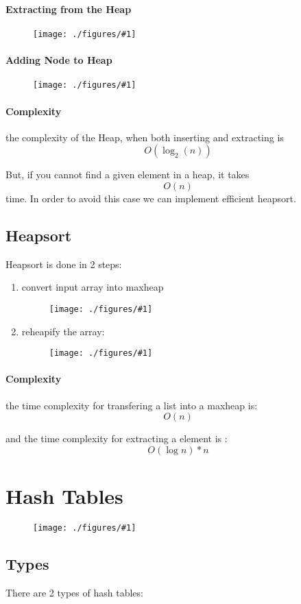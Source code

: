 \documentclass[12pt]{book}
\newcommand{\incimg}[2]{%
       \begin{figure}[h]
               \centering
               \texttt{[image: ./figures/\#1]}
       \end{figure}
}
\begin{document}
\paragraph{Extracting from the Heap}
\incimg{extractHeap}{0.5}

\paragraph{Adding Node to Heap}
\incimg{addHeap}{0.5}

\paragraph{Complexity}
the complexity of the Heap, when both inserting and extracting is 
\[O(\log_2(n))\]

But, if you cannot find a given element in a heap, it takes 
\[O(n)\]
time. In order to avoid this case we can implement efficient heapsort.

\subsection*{Heapsort}
Heapsort is done in 2 steps:
\begin{enumerate}
        \item convert input array into maxheap
                \incimg{heapsort1}{0.5}

        \item reheapify the array:
                \incimg{heapsort2}{0.5}
\end{enumerate}

\paragraph{Complexity}
the time complexity for transfering a list into a maxheap is:
\[O(n)\]

and the time complexity for extracting a element is :
\[O(\log n) * n\]

\pagebreak
\section*{Hash Tables}

\incimg{hashtable}{0.2}

\pagebreak
\subsection*{Types} There are 2 types of hash tables:
\end{document}
